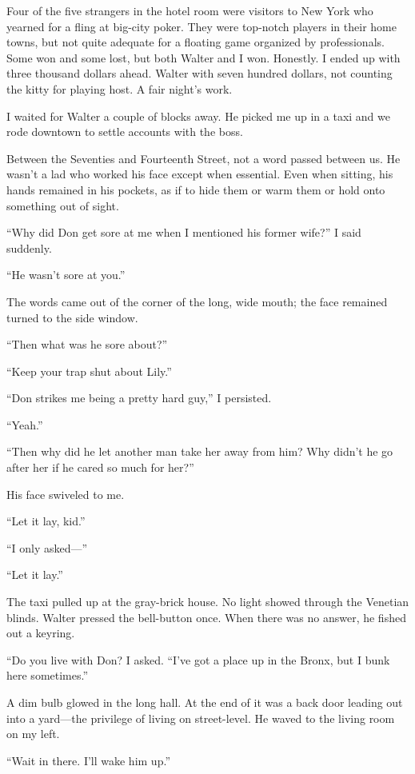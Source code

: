 \documentclass{novel}
\begin{document}
Four of the five strangers in the hotel room were visitors to New York who yearned for a fling at big-city poker. They were top-notch players in their home towns, but not quite adequate for a floating game organized by professionals. Some won and some lost, but both Walter and I won. Honestly. I ended up with three thousand dollars ahead. Walter with seven hundred dollars, not counting the kitty for playing host. A fair night’s work.

I waited for Walter a couple of blocks away. He picked me up in a taxi and we rode downtown to settle accounts with the boss. 

Between the Seventies and Fourteenth Street, not a word passed between us. He wasn’t a lad who worked his face except when essential. Even when sitting, his hands remained in his pockets, as if to hide them or warm them or hold onto something out of sight.

“Why did Don get sore at me when I mentioned his former wife?” I said suddenly.

“He wasn’t sore at you.”

The words came out of the corner of the long, wide mouth; the face remained turned to the side window.

“Then what was he sore about?”

“Keep your trap shut about Lily.”

“Don strikes me being a pretty hard guy,” I persisted.

“Yeah.”

“Then why did he let another man take her away from him? Why didn’t he go after her if he cared so much for her?”

His face swiveled to me.

“Let it lay, kid.”

“I only asked—”

“Let it lay.”

The taxi pulled up at the gray-brick house. No light showed through the Venetian blinds. Walter pressed the bell-button once. When there was no answer, he fished out a keyring.

“Do you live with Don? I asked. “I’ve got a place up in the Bronx, but I bunk here sometimes.”

A dim bulb glowed in the long hall. At the end of it was a back door leading out into a yard—the privilege of living on street-level. He waved to the living room on my left.

“Wait in there. I’ll wake him up.”
\end{document}
